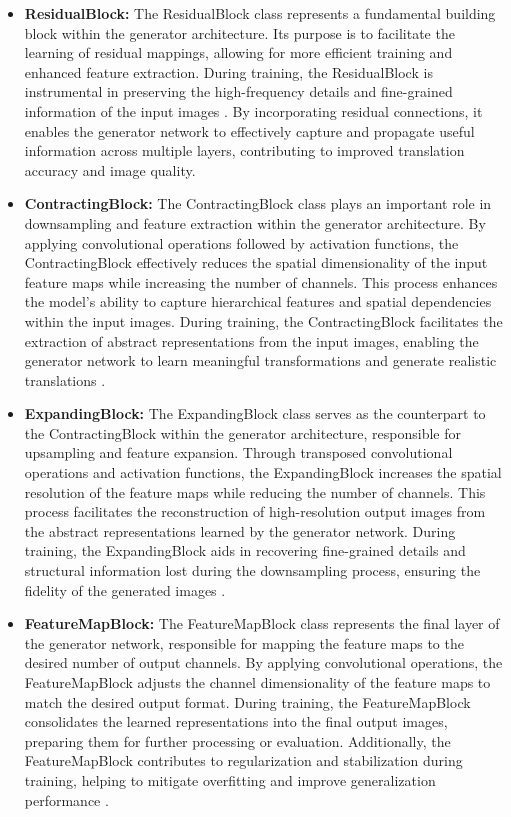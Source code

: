 \documentclass[UKenglish,12pt]{master-style}
\begin{document}
\begin{itemize}
\item \textbf{ResidualBlock:}
The ResidualBlock class represents a fundamental building block within the generator architecture. Its purpose is to facilitate the learning of residual mappings, allowing for more efficient training and enhanced feature extraction. During training, the ResidualBlock is instrumental in preserving the high-frequency details and fine-grained information of the input images \cite{CycleGAN} . By incorporating residual connections, it enables the generator network to effectively capture and propagate useful information across multiple layers, contributing to improved translation accuracy and image quality.

\item \textbf{ContractingBlock:}
The ContractingBlock class plays an important role in downsampling and feature extraction within the generator architecture. By applying convolutional operations followed by activation functions, the ContractingBlock effectively reduces the spatial dimensionality of the input feature maps while increasing the number of channels. This process enhances the model's ability to capture hierarchical features and spatial dependencies within the input images. During training, the ContractingBlock facilitates the extraction of abstract representations from the input images, enabling the generator network to learn meaningful transformations and generate realistic translations \cite{CycleGAN} .

\item \textbf{ExpandingBlock:}
The ExpandingBlock class serves as the counterpart to the ContractingBlock within the generator architecture, responsible for upsampling and feature expansion. Through transposed convolutional operations and activation functions, the ExpandingBlock increases the spatial resolution of the feature maps while reducing the number of channels. This process facilitates the reconstruction of high-resolution output images from the abstract representations learned by the generator network. During training, the ExpandingBlock aids in recovering fine-grained details and structural information lost during the downsampling process, ensuring the fidelity of the generated images \cite{CycleGAN} .

\item \textbf{FeatureMapBlock:}
The FeatureMapBlock class represents the final layer of the generator network, responsible for mapping the feature maps to the desired number of output channels. By applying convolutional operations, the FeatureMapBlock adjusts the channel dimensionality of the feature maps to match the desired output format. During training, the FeatureMapBlock consolidates the learned representations into the final output images, preparing them for further processing or evaluation. Additionally, the FeatureMapBlock contributes to regularization and stabilization during training, helping to mitigate overfitting and improve generalization performance \cite{CycleGAN} .


\end{itemize}
\end{document}
